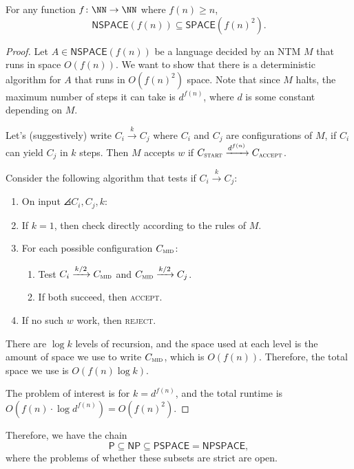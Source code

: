 \documentclass{standalone}
\begin{document}
\begin{theorem}[Savitch]
  For any function \(f \colon \NN \to \NN\) where \(f(n) \geq n\),
  \[
    \mathsf{NSPACE}(f(n)) \subseteq \mathsf{SPACE}(f(n)^2).
  \]
\end{theorem}
\begin{proof}
  Let \(A \in \mathsf{NSPACE}(f(n))\) be a language decided by
  an \textsf{NTM} \(M\) that runs in space \(O(f(n))\).
  We want to show that there is a deterministic algorithm for \(A\)
  that runs in \(O(f(n)^2)\) space.
  Note that since \(M\) halts, the maximum number of steps it can take
  is \(d^{f(n)}\), where \(d\) is some constant depending on \(M\).

  Let's (suggestively) write \(C_i \xrightarrow{k} C_j\)
  where \(C_i\) and \(C_j\) are configurations of \(M\),
  if \(C_i\) can yield \(C_j\) in \(k\) steps.
  Then \(M\) accepts \(w\) if
  \(C_{\textsc{start}} \xrightarrow{d^{f(n)}} C_{\textsc{accept}}\).

  Consider the following algorithm that tests if \(C_i \xrightarrow{k} C_j\):
  \begin{enumerate}[start=0]
    \item On input \(\angles{C_i, C_j, k}\):
    \item If \(k = 1\), then check directly according to the rules of \(M\).
    \item For each possible configuration \(C_{\textsc{mid}}\):
    \begin{enumerate}[nosep]
      \item Test \(C_i \xrightarrow{k/2} C_{\textsc{mid}}\)
            and \(C_{\textsc{mid}} \xrightarrow{k/2} C_j\).
      \item If both succeed, then \textsc{accept}.
    \end{enumerate}
    \item If no such \(w\) work, then \textsc{reject}.
  \end{enumerate}
  There are \(\log k\) levels of recursion, and the space used at each level
  is the amount of space we use to write \(C_{\textsc{mid}}\),
  which is \(O(f(n))\).
  Therefore, the total space we use is \(O(f(n)\log k)\).

  The problem of interest is for \(k = d^{f(n)}\),
  and the total runtime is \(O(f(n) \cdot \log d^{f(n)}) = O(f(n)^2)\).
\end{proof}

Therefore, we have the chain
\[
  \mathsf{P} \subseteq \mathsf{NP} \subseteq \mathsf{PSPACE} = \mathsf{NPSPACE},
\]
where the problems of whether these subsets are strict are open.
\end{document}
